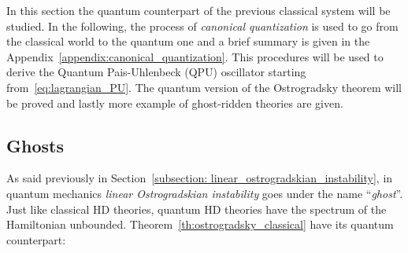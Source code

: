 In this section the quantum counterpart of the previous classical system will be
studied. In the following, the process of \emph{canonical quantization} is used
to go from the classical world to the quantum one and a brief summary is given
in the Appendix~\ref{appendix:canonical_quantization}. This procedures will be
used to derive the Quantum Pais-Uhlenbeck (QPU) oscillator starting
from~\eqref{eq:lagrangian_PU}. The quantum version of the Ostrogradsky theorem
will be proved and lastly more example of ghost-ridden theories are given.

\subsection{Ghosts}\label{section:ghosts}
As said previously in Section~\ref{subsection:
linear_ostrogradskian_instability}, in quantum mechanics \emph{linear
Ostrogradskian instability} goes under the name ``\emph{ghost}''.  Just like
classical HD theories, quantum HD theories have the spectrum of the Hamiltonian
unbounded. Theorem~\ref{th:ostrogradsky_classical} have its quantum counterpart:

